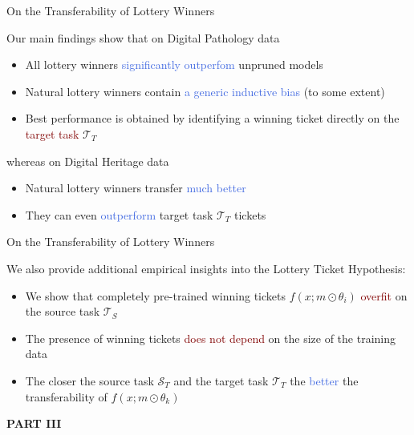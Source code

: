 \documentclass{beamer}
\begin{document}
\begin{frame}{On the Transferability of Lottery Winners}

	Our main findings show that on Digital Pathology data
	\bigskip
	\begin{itemize}
		\item All lottery winners \textcolor{RoyalBlue}{significantly outperfom} unpruned models 
		\item Natural lottery winners contain \textcolor{RoyalBlue}{a generic inductive bias} (to some extent)
		\item Best performance is obtained by identifying a winning ticket directly on the \textcolor{Maroon}{target task} $\mathcal{T}_T$
	\end{itemize}
	\bigskip

	whereas on Digital Heritage data
	\bigskip
	\begin{itemize}
		\item Natural lottery winners transfer \textcolor{RoyalBlue}{much better}
		\item They can even \textcolor{RoyalBlue}{outperform} target task $\mathcal{T}_T$ tickets
	\end{itemize}
\end{frame}

\begin{frame}{On the Transferability of Lottery Winners}
	
	We also provide additional empirical insights into the Lottery Ticket Hypothesis:

	\begin{itemize}
		\item We show that completely pre-trained winning tickets $f(x;m \odot \theta_i)$ \textcolor{Maroon}{overfit} on the source task $\mathcal{T}_S$ 
		\item The presence of winning tickets \textcolor{Maroon}{does not depend} on the size of the training data
		\item The closer the source task $\mathcal{S}_T$ and the target task $\mathcal{T}_T$ the \textcolor{RoyalBlue}{better} the transferability of $f(x;m \odot \theta_k)$
	\end{itemize}

\end{frame}


\begin{frame}
	\begin{center}
		\textcolor{skymagenta}{\textbf{PART III}}
	\end{center}
\end{frame}
\end{document}
